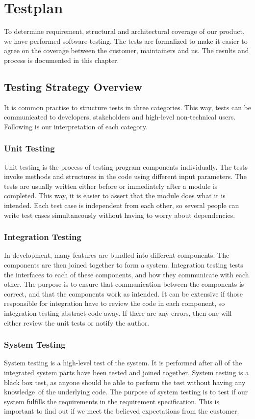 \chapter{Testplan} 
To determine requirement, structural and architectural
coverage of our product, we have performed software testing. The tests are
formalized to make it easier to agree on the coverage between the customer,
maintainers and us. The results and process is documented in this chapter.

\section{Testing Strategy Overview} It is common practise to structure tests in
three categories. This way, tests can be communicated to developers,
stakeholders and high-level non-technical users.  Following is our
interpretation of each category.  

\subsection{Unit Testing} Unit testing is the
process of testing program components individually.  The tests invoke methods
and structures in the code using different input parameters. The tests are
usually written either before or immediately after a module is completed. This
way, it is easier to assert that the module does what it is intended. Each test
case is independent from each other, so several people can write test cases
simultaneously without having to worry about dependencies.

\subsection{Integration Testing} In development, many features are bundled into
different components. The components are then joined together to form a system.
Integration testing tests the interfaces to each of these components, and how
they communicate with each other. The purpose is to ensure that communication
between the components is correct, and that the components work as intended. It
can be extensive if those responsible for integration have to review the code
in each component, so integration testing abstract code away. If there are any
errors, then one will either review the unit tests or notify the author.

\subsection{System Testing} System testing is a high-level test of the system.
It is performed after all of the integrated system parts have been tested and
joined together. System testing is a black box test, as anyone should be able
to perform the test without having any knowledge\ of the underlying code. The
purpose of system testing is to test if our system fulfills the requirements in
the requirement specification. This is important to find out if we meet the
believed expectations from the customer. 

